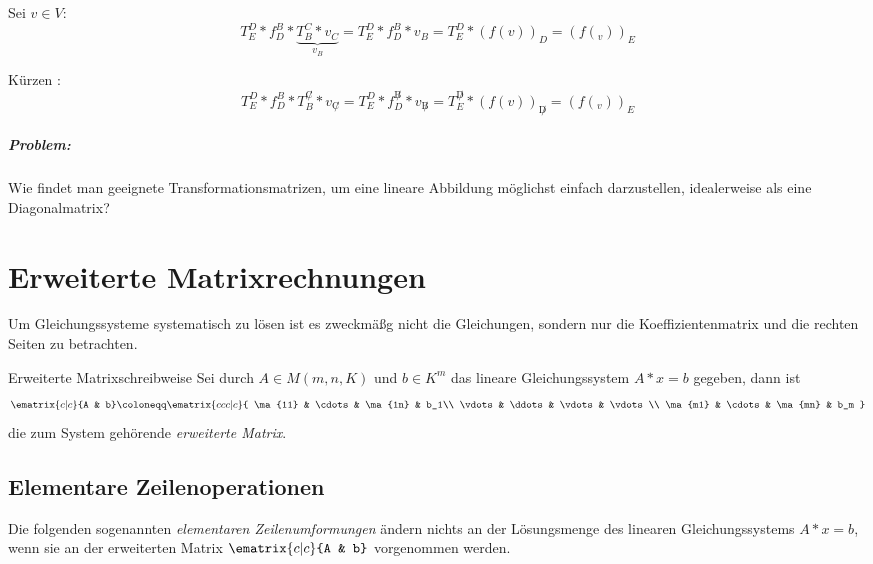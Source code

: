\begin{beweis}{}
	Sei $v\in V$:
	\begin{equation*}
		T_E^D*f^B_D* \underbrace{T_B^C*v_C}_{v_B}=T_E^D*f_D^B*v_B=T^D_E*\left(f(v)\right)_D = \left(f(_v)\right)_E
	\end{equation*}
\end{beweis}

\merkregel \glqq Kürzen \grqq:
\begin{equation*}
	T_E^D*f^B_D*T_B^{\not C}*v_{\not C}=T_E^D*f_D^{\not B}*v_{\not B}=T^{\not D}_E*\left(f(v)\right)_{\not D} = \left(f(_v)\right)_E
\end{equation*}


\paragraph{Problem:}
Wie findet man geeignete Transformationsmatrizen, um eine lineare Abbildung möglichst einfach darzustellen, idealerweise als eine Diagonalmatrix?


\chapter{Erweiterte Matrixrechnungen}
Um Gleichungssysteme systematisch zu lösen ist es zweckmäßg nicht die Gleichungen, sondern nur die Koeffizientenmatrix und die rechten Seiten zu betrachten.

\begin{definition}{Erweiterte Matrixschreibweise}
	Sei durch $A\in M(m,n,K)$ und $b\in K^m$ das lineare Gleichungssystem $A*x=b$ gegeben, dann ist
	\begin{equation*}
		\ematrix{c|c}{A & b}\coloneqq\ematrix{c c c | c}{
			\ma{11} & \cdots & \ma{1n} & b_1\\
			\vdots & \ddots & \vdots & \vdots\\
			\ma{m1} & \cdots & \ma{mn} & b_m
		}
	\end{equation*}
	die zum System gehörende \emph{erweiterte Matrix}.
\end{definition}

\section{Elementare Zeilenoperationen}
Die folgenden sogenannten \emph{elementaren Zeilenumformungen} ändern nichts an der Lösungsmenge des linearen Gleichungssystems $A*x=b$, wenn sie an der erweiterten Matrix $\ematrix{c|c}{A & b}$ vorgenommen werden.

